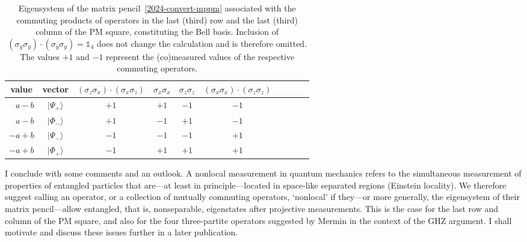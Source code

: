 \documentclass[
  twocolumn,
 showpacs,
 showkeys,
 preprintnumbers,
 amsmath,amssymb,
 aps,
 prl,
  longbibliography,
 floatfix,
 ]{revtex4-2}
\newcommand\myotimes{ }
\begin{document}
\begin{table}[t]
\caption{\label{2024-convert-pm-es}Eigensystem of the matrix pencil~\eqref{2024-convert-mppm}
associated with the commuting  products of operators in the last (third) row and the last (third) column of the PM square,
constituting the Bell basis.
Inclusion of  $(\sigma_y \myotimes \sigma_y) \cdot (\sigma_y \myotimes \sigma_y) = \mathbb{1}_4$
does not change the calculation and is therefore omitted.
The values $+1$ and $-1$ represent the (co)measured values of the respective commuting operators.
}
\centering
\begin{ruledtabular}
\begin{tabular}{rccccccccc}
\multicolumn{1}{c}{value} &
\multicolumn{1}{c}{vector} &
$(\sigma_z \myotimes  \sigma_x) \cdot (\sigma_x\myotimes  \sigma_z)$ &
$\sigma_x \myotimes  \sigma_x$ &
$\sigma_z\myotimes  \sigma_z$ &
$(\sigma_x \myotimes  \sigma_x) \cdot  (\sigma_z\myotimes  \sigma_z)$
\\
\hline
   $a - b$ &          $ \vert \Psi_+ \rangle $   &   $+1$  &  $+1$    &  $-1$   &  $-1$      \\
   $a - b$ &          $ \vert \Phi_- \rangle $   &   $+1$  &  $-1$    &  $+1$   &  $-1$      \\
   $-a + b$ &         $ \vert \Psi_- \rangle $   &   $-1$  &  $-1$    &  $-1$   &  $+1$      \\
   $-a + b$ &         $ \vert \Phi_+ \rangle $   &   $-1$  &  $+1$    &  $+1$   &  $+1$      \\
\end{tabular}
\end{ruledtabular}
\end{table}


I conclude with some comments and an outlook.
A nonlocal measurement in quantum mechanics refers to the simultaneous measurement of properties of entangled particles that are---at least in principle---located in space-like separated regions (Einstein locality).
We therefore suggest calling an operator, or a collection of mutually commuting operators, `nonlocal' if they---or more generally, the eigensystem of their matrix pencil---allow entangled, that is, nonseparable, eigenstates after projective measurements.
This is the case for the last row and column of the PM square, and also for the four three-partite operators suggested by Mermin in the context of the GHZ argument.
I shall motivate and discuss these issues further in a later publication.
\end{document}
